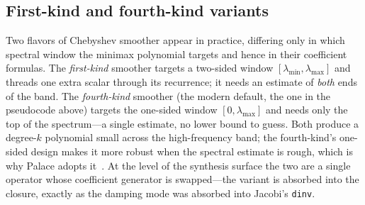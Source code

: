 \subsection{First-kind and fourth-kind variants}

Two flavors of Chebyshev smoother appear in practice, differing only in which
spectral window the minimax polynomial targets and hence in their coefficient
formulas. The \emph{first-kind} smoother targets a two-sided window
$[\lambda_{\min},\lambda_{\max}]$ and threads one extra scalar through its
recurrence; it needs an estimate of \emph{both} ends of the band. The
\emph{fourth-kind} smoother (the modern default, the one in the pseudocode above)
targets the one-sided window $[0,\lambda_{\max}]$ and needs only the top of the
spectrum---a single estimate, no lower bound to guess. Both produce a degree-$k$
polynomial small across the high-frequency band; the fourth-kind's one-sided design
makes it more robust when the spectral estimate is rough, which is why Palace adopts
it~\citep{phillipsfischer2022}. At the level of the synthesis surface the two are a
single operator whose coefficient generator is swapped---the variant is absorbed into
the closure, exactly as the damping mode was absorbed into Jacobi's
\lstinline[style=l4style]|dinv|.


